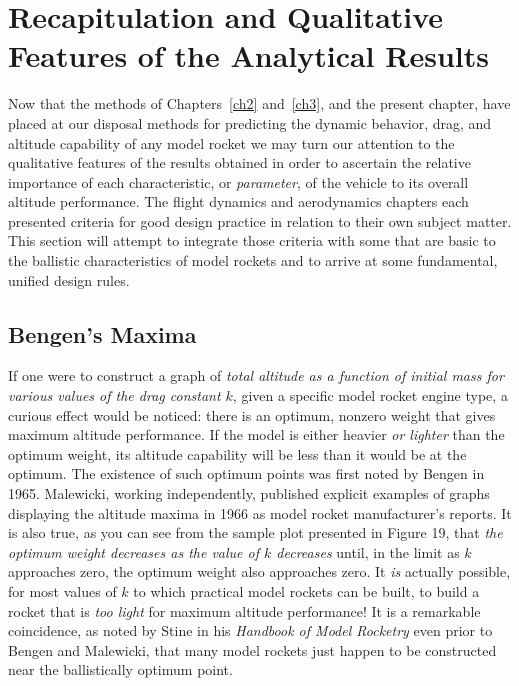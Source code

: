 \section{Recapitulation and Qualitative Features of the Analytical Results}\label{ch4:sec:5}

Now that the methods of Chapters~\ref{ch2} and~\ref{ch3}, and the present chapter, have placed at
our disposal methods for predicting the dynamic behavior, drag, and altitude capability of any
model rocket we may turn our attention to the qualitative features of the results obtained in
order to ascertain the relative importance of each characteristic, or \emph{parameter}, of the
vehicle to its overall altitude performance. The flight dynamics and aerodynamics chapters each
presented criteria for good design practice in relation to their own subject matter. This section
will attempt to integrate those criteria with some that are basic to the ballistic characteristics
of model rockets and to arrive at some fundamental, unified design rules.

\subsection{Bengen's Maxima}\label{ch4:sec:5.1}

If one were to construct a graph of \emph{total altitude as a function of initial mass for various
values of the drag constant $k$}, given a specific model rocket engine type, a curious effect would
be noticed: there is an optimum, nonzero weight that gives maximum altitude performance. If the
model is either heavier \emph{or lighter} than the optimum weight, its altitude capability will be
less than it would be at the optimum. The existence of such optimum points was first noted by
Bengen in 1965. Malewicki, working independently, published explicit examples of graphs displaying
the altitude maxima in 1966 as model rocket manufacturer's reports. It is also true, as you can see
from the sample plot presented in Figure 19, that \emph{the optimum weight
decreases as the value of $k$ decreases} until, in the limit as $k$ approaches zero, the optimum
weight also approaches zero. It \emph{is} actually possible, for most values of $k$ to which
practical model rockets can be built, to build a rocket that is \emph{too light} for maximum
altitude performance! It is a remarkable coincidence, as noted by Stine in his \emph{Handbook of
Model Rocketry} even prior to Bengen and Malewicki, that many model rockets just happen to be
constructed near the ballistically optimum point.

